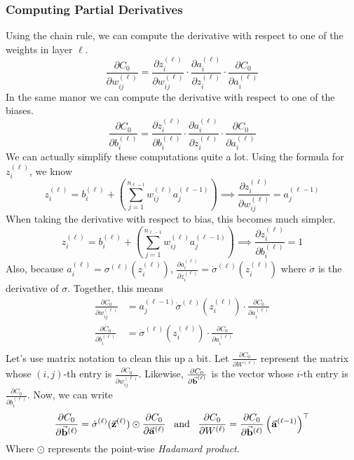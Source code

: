 \subsubsection{Computing Partial Derivatives}

Using the chain rule, we can compute the derivative with respect to one of the weights in layer $\ell$.
\[
    \frac{\partial C_0}{\partial w_{ij}^{(\ell)}} = \frac{\partial z_i^{(\ell)}}{\partial w_{ij}^{(\ell)}} \cdot 
                                                    \frac{\partial a_i^{(\ell)}}{\partial z_i^{(\ell)}} \cdot 
                                                    \frac{\partial C_0}{\partial a_i^{(\ell)}}
\]
In the same manor we can compute the derivative with respect to one of the biases.
\[
    \frac{\partial C_0}{\partial b_i^{(\ell)}} = \frac{\partial z_i^{(\ell)}}{\partial b_i^{(\ell)}} \cdot 
                                                    \frac{\partial a_i^{(\ell)}}{\partial z_i^{(\ell)}} \cdot 
                                                    \frac{\partial C_0}{\partial a_i^{(\ell)}}
\]
We can actually simplify these computations quite a lot. Using the formula for $z_i^{(\ell)}$, we know 
\[
    z_i^{(\ell)} = b_i^{(\ell)} + \left(\sum_{j = 1}^{n_{\ell - 1}} w_{ij}^{(\ell)} a_j^{(\ell - 1)}\right)
    \implies \frac{\partial z_i^{(\ell)}}{\partial w_{ij}^{(\ell)}} = a_j^{(\ell - 1)}
\]
When taking the derivative with respect to bias, this becomes much simpler.
\[
    z_i^{(\ell)} = b_i^{(\ell)} + \left(\sum_{j = 1}^{n_{\ell - 1}} w_{ij}^{(\ell)} a_j^{(\ell - 1)}\right)
    \implies \frac{\partial z_i^{(\ell)}}{\partial b_{i}^{(\ell)}} = 1
\]
Also, because $a_i^{(\ell)} = \sigma^{(\ell)}(z_i^{(\ell)})$, $\frac{\partial a_i^{(\ell)}}{\partial z_i^{(\ell)}} = \dot{\sigma}^{(\ell)}(z_i^{(\ell)})$
where $\dot\sigma$ is the derivative of $\sigma$. Together, this means 
\begin{align*}
    \frac{\partial C_0}{\partial w_{ij}^{(\ell)}} &= a_j^{(\ell - 1)} \dot\sigma^{(\ell)}(z_i^{(\ell)})\cdot\frac{\partial C_0}{\partial a_i^{(\ell)}} \\
    \frac{\partial C_0}{\partial b_{i}^{(\ell)}} &= \dot\sigma^{(\ell)}(z_i^{(\ell)})\cdot\frac{\partial C_0}{\partial a_i^{(\ell)}} \\
\end{align*}
Let's use matrix notation to clean this up a bit. Let $\frac{\partial C_0}{\partial W^{(\ell)}}$ represent the matrix whose $(i, j)$-th entry 
is $\frac{\partial C_0}{\partial w_{ij}^{(\ell)}}$. Likewise, $\frac{\partial C_0}{\partial {\vec{\mathbf{b}}}^{(\ell)}}$ is the vector whose $i$-th 
entry is $\frac{\partial C_0}{\partial b_{i}^{(\ell)}}$. Now, we can write 
\[
    \frac{\partial C_0}{\partial \vec{\mathbf{b}}^{(\ell)}} = \dot\sigma^{(\ell)}(\vec{\mathbf{z}}^{(\ell)}) \odot \frac{\partial C_0}{\partial \vec{\mathbf{a}}^{(\ell)}} \;\;\; \text{and} \;\;\; \frac{\partial C_0}{\partial W^{(\ell)}} = \frac{\partial C_0}{\partial \vec{\mathbf{b}}^{(\ell)}} \left(\vec{\mathbf{a}}^{(\ell - 1)}\right)^\top
\]
Where $\odot$ represents the point-wise \textit{Hadamard product}.


